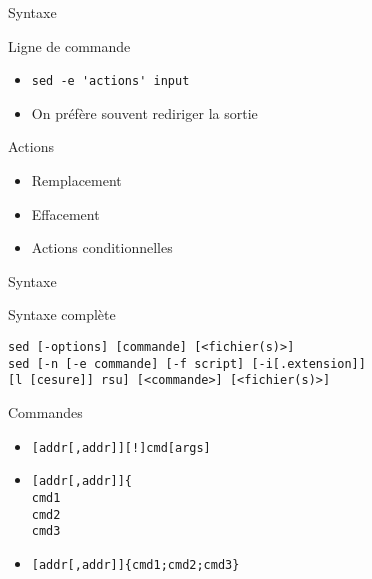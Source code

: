 \def\ftitle{Syntaxe}
\begin{frame}[containsverbatim]{\ftitle}
\def\blocktitle{Ligne de commande}
\begin{block}{\blocktitle}
\begin{itemize}
\item \verb!sed -e 'actions' input!
\item On préfère souvent rediriger la sortie
\end{itemize}
\end{block}
\def\blocktitle{Actions}
\begin{block}{\blocktitle}
\begin{itemize}
\item Remplacement
\item Effacement
\item Actions conditionnelles
\end{itemize}
\end{block}
\end{frame}


\begin{frame}[containsverbatim]{\ftitle}
\def\blocktitle{Syntaxe complète}
\begin{block}{\blocktitle}\begin{verbatim}
sed [-options] [commande] [<fichier(s)>]
sed [-n [-e commande] [-f script] [-i[.extension]] 
[l [cesure]] rsu] [<commande>] [<fichier(s)>]
\end{verbatim}
\end{block}
\def\blocktitle{Commandes}
\begin{block}{\blocktitle}
\begin{itemize}
\item \verb/[addr[,addr]][!]cmd[args]/
\item \begin{verbatim}[addr[,addr]]{
cmd1
cmd2
cmd3
\end{verbatim}
\item \verb![addr[,addr]]{cmd1;cmd2;cmd3}!
\end{itemize}
\end{block}
\end{frame}


